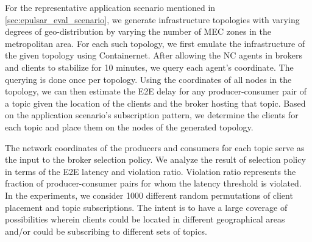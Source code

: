 For the representative application scenario mentioned in \cref{sec:epulsar_eval_scenario}, we generate infrastructure topologies with varying degrees of geo-distribution by varying the number of MEC zones in the metropolitan area. For each such topology, we first emulate the infrastructure of the given topology using Containernet. After allowing the NC agents in brokers and clients to stabilize for 10 minutes, we query each agent's coordinate. The querying is done once per topology. Using the coordinates of all nodes in the topology, we can then estimate the E2E delay for any producer-consumer pair of a topic given the location of the clients and the broker hosting that topic. Based on the application scenario's subscription pattern, we determine the clients for each topic and place them on the nodes of the generated topology. 

The network coordinates of the producers and consumers for each topic serve as the input to the broker selection policy. We analyze the result of selection policy in terms of the E2E latency and violation ratio. Violation ratio represents the fraction of producer-consumer pairs for whom the latency threshold is violated. In the experiments, we consider 1000 different random permutations of client placement and topic subscriptions.  The intent is to have a large coverage of possibilities wherein clients could be located in different geographical areas and/or could be subscribing to different sets of topics.

